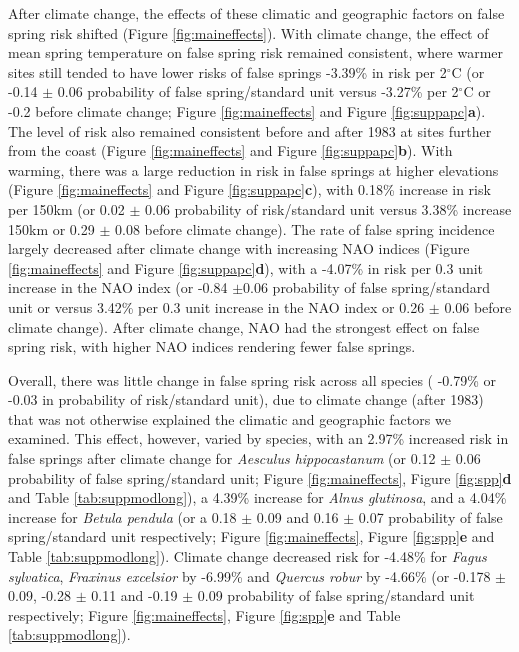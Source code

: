\documentclass{article}\usepackage[]{graphicx}\usepackage[]{color}
\begin{document}
After climate change, the effects of these climatic and geographic factors on false spring risk shifted (Figure \ref{fig:maineffects}). With climate change, the effect of mean spring temperature on false spring risk remained consistent, where warmer sites still tended to have lower risks of false springs -3.39\% in risk per 2$^{\circ}$C (or -0.14 $\pm$ 0.06 probability of false spring/standard unit versus -3.27\% per 2$^{\circ}$C or -0.2 before climate change; Figure \ref{fig:maineffects} and Figure \ref{fig:suppapc}\textbf{a}). The level of risk also remained consistent before and after 1983 at sites further from the coast (Figure \ref{fig:maineffects} and Figure \ref{fig:suppapc}\textbf{b}). With warming, there was a large reduction in risk in false springs at higher elevations (Figure \ref{fig:maineffects} and Figure \ref{fig:suppapc}\textbf{c}), with 0.18\% increase in risk per 150km (or 0.02 $\pm$ 0.06 probability of risk/standard unit versus 3.38\% increase 150km or 0.29 $\pm$ 0.08 before climate change). The rate of false spring incidence largely decreased after climate change with increasing NAO indices (Figure \ref{fig:maineffects} and Figure \ref{fig:suppapc}\textbf{d}), with a -4.07\% in risk per 0.3 unit increase in the NAO index (or -0.84 $\pm$0.06 probability of false spring/standard unit or versus 3.42\% per 0.3 unit increase in the NAO index or 0.26 $\pm$ 0.06 before climate change). After climate change, NAO had the strongest effect on false spring risk, with higher NAO indices rendering fewer false springs.

Overall, there was little change in false spring risk across all species ( -0.79\% or -0.03 in probability of risk/standard unit), due to climate change (after 1983) that was not otherwise explained the climatic and geographic factors we examined. This effect, however, varied by species, with an 2.97\% increased risk in false springs after climate change for \textit{Aesculus hippocastanum} (or 0.12 $\pm$ 0.06 probability of false spring/standard unit; Figure \ref{fig:maineffects}, Figure \ref{fig:spp}\textbf{d} and Table \ref{tab:suppmodlong}), a 4.39\% increase for \textit{Alnus glutinosa}, and a 4.04\% increase for \textit{Betula pendula} (or a 0.18 $\pm$ 0.09 and 0.16 $\pm$ 0.07 probability of false spring/standard unit respectively; Figure \ref{fig:maineffects}, Figure \ref{fig:spp}\textbf{e} and Table \ref{tab:suppmodlong}). Climate change decreased risk for -4.48\% for \textit{Fagus sylvatica}, \textit{Fraxinus excelsior} by -6.99\% and \textit{Quercus robur} by -4.66\% (or -0.178 $\pm$ 0.09, -0.28 $\pm$ 0.11 and -0.19 $\pm$ 0.09 probability of false spring/standard unit respectively; Figure \ref{fig:maineffects}, Figure \ref{fig:spp}\textbf{e} and Table \ref{tab:suppmodlong}).  
\end{document}
